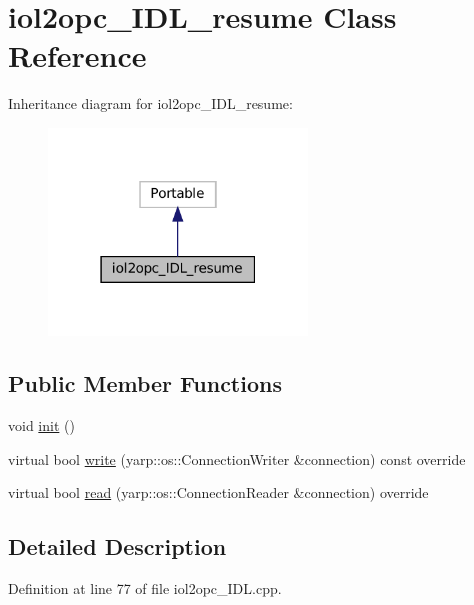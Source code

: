 \hypertarget{classiol2opc__IDL__resume}{}\section{iol2opc\+\_\+\+I\+D\+L\+\_\+resume Class Reference}
\label{classiol2opc__IDL__resume}


Inheritance diagram for iol2opc\+\_\+\+I\+D\+L\+\_\+resume\+:
\nopagebreak
\begin{figure}[H]
\begin{center}
\leavevmode
\includegraphics[width=195pt]{classiol2opc__IDL__resume__inherit__graph}
\end{center}
\end{figure}
\subsection*{Public Member Functions}
\begin{DoxyCompactItemize}
\item 
void \hyperlink{classiol2opc__IDL__resume_aaa0eb236ad333fe632b5d1fceb26ab97}{init} ()
\item 
virtual bool \hyperlink{classiol2opc__IDL__resume_afd2563b731bbdd6383c6d3aaf0047375}{write} (yarp\+::os\+::\+Connection\+Writer \&connection) const override
\item 
virtual bool \hyperlink{classiol2opc__IDL__resume_ac2c03f7c09cb3901a8f879306bfd823e}{read} (yarp\+::os\+::\+Connection\+Reader \&connection) override
\end{DoxyCompactItemize}


\subsection{Detailed Description}


Definition at line 77 of file iol2opc\+\_\+\+I\+D\+L.\+cpp.



